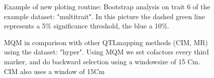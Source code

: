 	\begin{figure}[ht]  
	  \hfill
	  \caption{Example of new ploting routine: Bootstrap analysis on trait 6 of the example dataset: "multitrait". In this picture the dashed green line represents a 5\% significance threshold, the blue a 10\%.}
	  \label{fig:FigureBoot}
	\end{figure}
	
	\begin{figure}[ht]
	  \hfill
	  \caption{MQM in comparison with other QTLmapping methods (CIM, MR) using the dataset: "hyper". Using MQM we set cofactors every third marker, and do backward selection using a windowsize of 15 Cm. CIM also uses a window of 15Cm}
	  \label{fig:FigureHyper}
	\end{figure}
	
